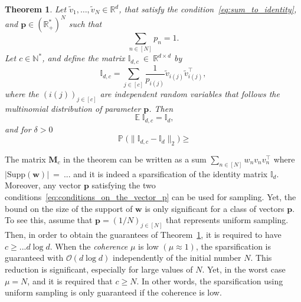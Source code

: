 \documentclass[twoside,11pt]{book}
\newtheorem{theorem}{Theorem}
\numberwithin{theorem}{chapter}
\numberwithin{definition}{chapter}
\numberwithin{proposition}{chapter}
\numberwithin{corollary}{chapter}
\numberwithin{example}{chapter}
\numberwithin{lemma}{chapter}
\numberwithin{assumption}{chapter}
\DeclareMathOperator{\Tran}{\intercal}
\DeclareMathOperator{\EX}{\mathbb{E}}
\DeclareMathOperator{\Prb}{\mathbb{P}}
\begin{document}
\begin{theorem}\label{thm:matrix_bernstein_identity_sparsification}
Let $\tilde{v}_{1}, \dots, \tilde{v}_{N} \in \mathbb{R}^{d}$, that satisfy the condition~\eqref{eq:sum_to_identity}, and
$\bm{p} \in (\mathbb{R}_{+}^{*})^{N}$ such that
\begin{equation}
\sum\limits_{n \in [N]} p_{n} = 1.
\end{equation}
Let $c \in \mathbb{N}^{*}$, and define the matrix $\mathbb{I}_{d,c}~\in~\mathbb{R}^{d\times d}$ by
\begin{equation}
\mathbb{I}_{d,c} = \sum\limits_{j \in [c]} \frac{1}{p_{i(j)}}\tilde{v}_{i(j)}^{\phantom{\Tran}}\tilde{v}_{i(j)}^{\Tran},
\end{equation} 
where
the $(i(j))_{j \in [c]}$ are independent random variables that follows the multinomial distribution of parameter $\bm{p}$. Then
\begin{equation}
\EX \mathbb{I}_{d,c} = \mathbb{I}_{d},
\end{equation}
and for $\delta >0$
\begin{equation}
\Prb \bigg( \|\mathbb{I}_{d,c} - \mathbb{I}_{d}\|_{2} \bigg) \geq 
\end{equation}




\end{theorem}

The matrix $\bm{M}_{c}$ in the theorem can be written as a sum $\displaystyle \sum\limits_{n \in [N]}w_{n}v_{n}v_{n}^{\Tran}$ where $|\mathrm{Supp}(\bm{w})|~=~...$ and it is indeed a sparsification of the identity matrix $\mathbb{I}_{d}$. Moreover, any vector $\bm{p}$ satisfying the two conditions~\eqref{eq:conditions_on_the_vector_p} can be used for sampling. Yet, the bound on the size of the support of $\bm{w}$ is only significant for a class of vectors $\bm{p}$. To see this, assume that $\bm{p} = (1/N)_{j \in [N]}$ that represents uniform sampling. Then, in order to obtain the guarantees of Theorem~\ref{thm:matrix_bernstein_identity_sparsification}, it is required to have  $c \geq ... d \log d $. When the \emph{coherence} $\mu$ is low $(\mu \approx 1)$, the sparsification is guaranteed with $\mathcal{O}(d \log d)$ independently of the initial number $N$. This reduction is significant, especially for large values of $N$. Yet, in the worst case $\mu = N$, and it is required that $c \geq N$. In other words, the sparsification using uniform sampling is only guaranteed if the coherence is low.
\end{document}
